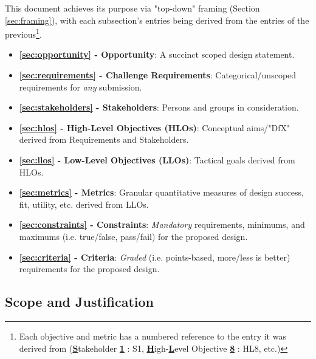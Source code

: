 \documentclass{../tex/report}
\begin{document}
This document achieves its purpose via "top-down" framing (Section \ref{sec:framing}), with each subsection's entries being derived from the entries of the
previous\footnote{Each objective and metric has a numbered reference to the entry it was derived from (\uline{\textbf{S}}takeholder \uline{\textbf{1}} : S1, \uline{\textbf{H}}igh-\uline{\textbf{L}}evel Objective \uline{\textbf{8}} : HL8, etc.)}.
\begin{itemize}
    \item \textbf{\ref{sec:opportunity} - Opportunity}: A succinct scoped design statement.
    \item \textbf{\ref{sec:requirements} - Challenge Requirements}: Categorical/unscoped requirements for \textit{any} submission.
    \item \textbf{\ref{sec:stakeholders} - Stakeholders}: Persons and groups in consideration.
    \item \textbf{\ref{sec:hlos} - High-Level Objectives (HLOs)}: Conceptual aims/"DfX" derived from Requirements and Stakeholders.
    \item \textbf{\ref{sec:llos} - Low-Level Objectives (LLOs)}: Tactical goals derived from HLOs.
    \item \textbf{\ref{sec:metrics} - Metrics}: Granular quantitative measures of design success, fit, utility, etc. derived from LLOs.
    \item \textbf{\ref{sec:constraints} - Constraints}: \textit{Mandatory} requirements, minimums, and maximums (i.e. true/false, pass/fail) for the proposed design.
    \item \textbf{\ref{sec:criteria} - Criteria}: \textit{Graded} (i.e. points-based, more/less is better) requirements for the proposed design.
\end{itemize} 

\newpage

\subsection{Scope and Justification}
\label{sec:scope}
\end{document}
